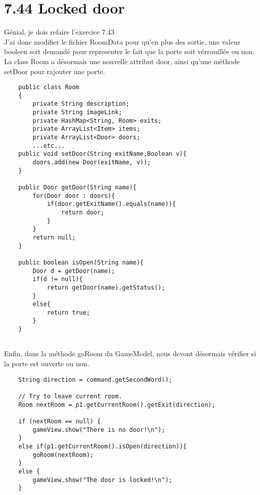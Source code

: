 \documentclass[a4paper , 10pt]{article}
\begin{document}
\section{7.44 Locked door}
Génial, je dois refaire l'exercice 7.43\\
J'ai donc modifier le fichier RoomData pour qu'en plus des sortie, une valeur booleen soit demandé pour representer le fait que 
la porte soit vérrouillée ou non.
La class Room a désormais une nouvelle attribut door, ainsi qu'une méthode setDoor pour rajouter une porte.
\begin{verbatim}
    public class Room 
    {
        private String description;
        private String imageLink;
        private HashMap<String, Room> exits;
        private ArrayList<Item> items;
        private ArrayList<Door> doors;
        ...etc...    
    public void setDoor(String exitName,Boolean v){
        doors.add(new Door(exitName, v));
    }

    public Door getDoor(String name){
        for(Door door : doors){
            if(door.getExitName().equals(name)){
                return door;
            }
        }
        return null;
    }

    public boolean isOpen(String name){
        Door d = getDoor(name);
        if(d != null){
            return getDoor(name).getStatus();
        }
        else{
            return true;
        }
    }
    

\end{verbatim}

Enfin, dans la méthode goRoom du GameModel, nous devont désormais vérifier si la porte est ouverte ou non.
\begin{verbatim}
    String direction = command.getSecondWord();

    // Try to leave current room.
    Room nextRoom = p1.getCurrentRoom().getExit(direction);

    if (nextRoom == null) {
        gameView.show("There is no door!\n");
    }
    else if(p1.getCurrentRoom().isOpen(direction)){
        goRoom(nextRoom);
    }
    else {
        gameView.show("The door is locked!\n");    
    }
\end{verbatim}
\end{document}
